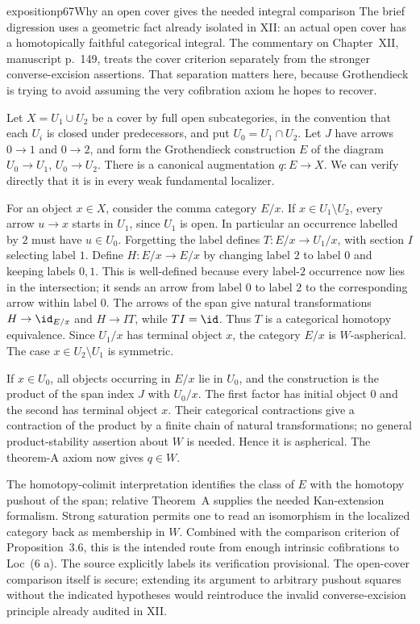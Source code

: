 \begin{dcomment}{exposition}{p67}{Why an open cover gives the needed integral comparison}
The brief digression uses a geometric fact already isolated in XII: an actual open cover has a homotopically faithful categorical integral. The commentary on Chapter~XII, manuscript p.~149, treats the cover criterion separately from the stronger converse-excision assertions. That separation matters here, because Grothendieck is trying to avoid assuming the very cofibration axiom he hopes to recover.

Let $X=U_1\cup U_2$ be a cover by full open subcategories, in the convention that each $U_i$ is closed under predecessors, and put $U_0=U_1\cap U_2$. Let $J$ have arrows $0\to1$ and $0\to2$, and form the Grothendieck construction $E$ of the diagram $U_0\to U_1$, $U_0\to U_2$. There is a canonical augmentation $q:E\to X$. We can verify directly that it is in every weak fundamental localizer.

For an object $x\in X$, consider the comma category $E/x$. If $x\in U_1\setminus U_2$, every arrow $u\to x$ starts in $U_1$, since $U_1$ is open. In particular an occurrence labelled by $2$ must have $u\in U_0$. Forgetting the label defines $T:E/x\to U_1/x$, with section $I$ selecting label $1$. Define $H:E/x\to E/x$ by changing label $2$ to label $0$ and keeping labels $0,1$. This is well-defined because every label-$2$ occurrence now lies in the intersection; it sends an arrow from label $0$ to label $2$ to the corresponding arrow within label $0$. The arrows of the span give natural transformations $H\to\id_{E/x}$ and $H\to IT$, while $TI=\id$. Thus $T$ is a categorical homotopy equivalence. Since $U_1/x$ has terminal object $x$, the category $E/x$ is $W$-aspherical. The case $x\in U_2\setminus U_1$ is symmetric.

If $x\in U_0$, all objects occurring in $E/x$ lie in $U_0$, and the construction is the product of the span index $J$ with $U_0/x$. The first factor has initial object $0$ and the second has terminal object $x$. Their categorical contractions give a contraction of the product by a finite chain of natural transformations; no general product-stability assertion about $W$ is needed. Hence it is aspherical. The theorem-A axiom now gives $q\in W$.

The homotopy-colimit interpretation identifies the class of $E$ with the homotopy pushout of the span; relative Theorem~A supplies the needed Kan-extension formalism. Strong saturation permits one to read an isomorphism in the localized category back as membership in $W$. Combined with the comparison criterion of Proposition~3.6, this is the intended route from enough intrinsic cofibrations to Loc~(6 a). The source explicitly labels its verification provisional. The open-cover comparison itself is secure; extending its argument to arbitrary pushout squares without the indicated hypotheses would reintroduce the invalid converse-excision principle already audited in XII.
\end{dcomment}

